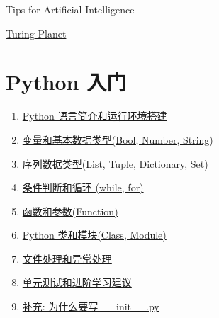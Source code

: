 \documentclass[11pt]{article}
\begin{document}
	\kaishu 
	\setcounter{section}{0}
	\begin{center}
		{\LARGE  Tips for Artificial Intelligence}
		
		
		{\large \href{https://www.youtube.com/@turingplanet4052}{Turing Planet}}
	\end{center}
\tableofcontents	
{\pagestyle{empty}\mbox{}\newpage\pagestyle{empty}}
\newpage 
\setcounter{page}{1}


\section{\kaishu Python 入门}

\begin{enumerate}
	\item \href{https://mp.weixin.qq.com/s/3k-Ov2r-v8TniyUqOBWyQw}{Python 语言简介和运行环境搭建} %
	\item \href{https://mp.weixin.qq.com/s/trfOXVDfRunc4ezQrd4p-Q}{变量和基本数据类型(Bool, Number, String)} %
	\item \href{https://mp.weixin.qq.com/s/HLCr11RGlDnUYlmhCibU-w}{序列数据类型(List, Tuple, Dictionary, Set)} %
	\item \href{https://mp.weixin.qq.com/s/QCXGFdUHSrieIeaS8rCdkA}{条件判断和循环 (while, for)} %
	\item \href{https://mp.weixin.qq.com/s/h3NseTBUcI3eMphy4dtsjg}{函数和参数(Function)} %
	\item \href{https://mp.weixin.qq.com/s/sxdPFlscGbGu7KIpgZy8lA}{Python 类和模块(Class, Module)} %
	\item \href{https://mp.weixin.qq.com/s/oJbC56Qi-REqFXYgg-VkQw}{文件处理和异常处理} %
	\item \href{https://mp.weixin.qq.com/s/z0VGfTgtEjMyvJzmYvLFEQ}{单元测试和进阶学习建议} %
	\item \href{https://mp.weixin.qq.com/s/3JcZEgajzD3vYC6dRjV9zQ}{补充: 为什么要写 \_\_init\_\_.py  }
\end{enumerate}
\end{document}
